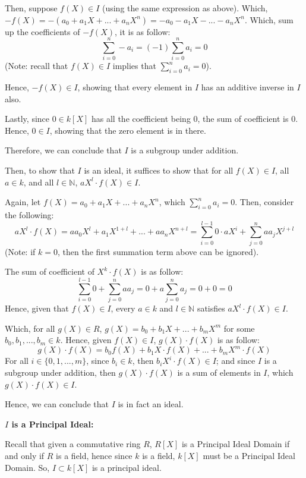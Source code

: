 \documentclass{article}
\begin{document}
Then, suppose $f(X)\in I$ (using the same expression as above). Which, $-f(X)=-(a_0+a_1X+...+a_nX^n) = -a_0-a_1X-...-a_nX^n$.
Which, sum up the coefficients of $-f(X)$, it is as follow:
$$\sum_{i=0}^{n}-a_i = (-1)\sum_{i=0}^{n}a_i = 0$$
(Note: recall that $f(X)\in I$ implies that $\sum_{i=0}^{n}a_i = 0$).

Hence, $-f(X)\in I$, showing that every element in $I$ has an additive inverse in $I$ also.

\hfill

Lastly, since $0\in k[X]$ has all the coefficient being $0$, the sum of coefficient is $0$. Hence, $0\in I$, showing that the zero element is in there.

Therefore, we can conclude that $I$ is a subgroup under addition.

\hfill

\hfill

Then, to show that $I$ is an ideal, it suffices to show that for all $f(X)\in I$, all $a\in k$, and all $l\in\mathbb{N}$, $aX^l\cdot f(X)\in I$.

Again, let $f(X)=a_0+a_1X+...+a_nX^n$, which $\sum_{i=0}^{n}a_i=0$. Then, consider the following: 
$$aX^l\cdot f(X)= aa_0X^l+a_1X^{1+l}+...+aa_nX^{n+l} = \sum_{i=0}^{l-1}0\cdot aX^i + \sum_{j=0}^{n}aa_jX^{j+l}$$
(Note: if $k=0$, then the first summation term above can be ignored).

The sum of coefficient of $X^k\cdot f(X)$ is as follow:
$$\sum_{i=0}^{l-1}0 + \sum_{j=0}^{n}aa_j = 0+a\sum_{j=0}^{n}a_j=0+0=0$$
Hence, given that $f(X)\in I$, every $a\in k$ and $l\in\mathbb{N}$ satisfies $aX^l\cdot f(X)\in I$.

\hfill

Which, for all $g(X)\in R$, $g(X)=b_0+b_1X+...+b_mX^m$ for some $b_0,b_1,...,b_m\in k$. Hence, given $f(X)\in I$, $g(X)\cdot f(X)$ is as follow:
$$g(X)\cdot f(X)= b_0f(X)+b_1X\cdot f(X)+...+b_mX^m\cdot f(X)$$
For all $i\in\{0,1,...,m\}$, since $b_i\in k$, then $b_iX^i\cdot f(X) \in I$; and since $I$ is a subgroup under addition, then $g(X)\cdot f(X)$ is a sum of elements in $I$, 
which $g(X)\cdot f(X)\in I$.

Hence, we can conclude that $I$ is in fact an ideal.

\hfill

\hfill

\textbf{$I$ is a Principal Ideal:}

Recall that given a commutative ring $R$, $R[X]$ is a Principal Ideal Domain if and only if $R$ is a field, hence since $k$ is a field, $k[X]$ must be a Principal Ideal Domain.
So, $I\subset k[X]$ is a principal ideal.
\end{document}
